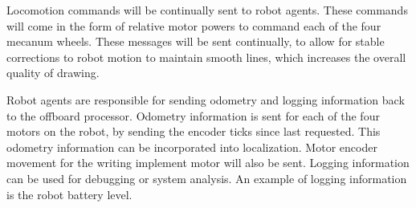 Locomotion commands will be continually sent to robot agents. These commands will come in the form of relative motor powers to command each of the four mecanum wheels. These messages will be sent continually, to allow for stable corrections to robot motion to maintain smooth lines, which increases the overall quality of drawing.

Robot agents are responsible for sending odometry and logging information back to the offboard processor. Odometry information is sent for each of the four motors on the robot, by sending the encoder ticks since last requested. This odometry information can be incorporated into localization. Motor encoder movement for the writing implement motor will also be sent. Logging information can be used for debugging or system analysis. An example of logging information is the robot battery level.

